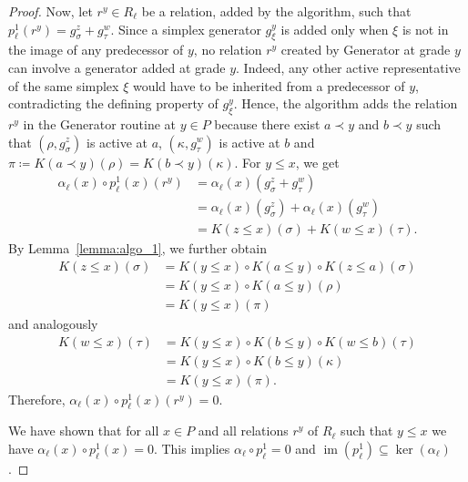 \documentclass[english,a4paper,nolineno,cleveref]{socg-lipics-v2021}
\DeclareMathOperator{\im}{im}
\begin{document}
\begin{proof}
Now, let $r^y\in R_\ell$ be a relation, added by the algorithm, such that $p_\ell^1(r^y)=g^z_\sigma+g^w_{\tau}$. Since a simplex generator $g_\xi^y$ is added only when
$\xi$ is not in the image of any predecessor of $y$, no relation
$r^y$ created by {\sc Generator} at grade $y$ can involve a generator
added at grade $y$. Indeed, any other active representative of the same
simplex $\xi$ would have to be inherited from a predecessor of $y$,
contradicting the defining property of $g_\xi^y$. Hence, the algorithm adds the relation $r^y$ in the {\sc Generator} routine at $y\in P$ because there exist $a\prec y$ and $b\prec y$ such that $(\rho,g^z_\sigma)$ is active at $a$, $(\kappa,g^w_{\tau})$ is active at $b$ and $\pi\coloneqq K(a\prec y)(\rho)=K(b\prec y)(\kappa)$. For $y\leq x$, we get 
\begin{equation*}
\begin{aligned}
\alpha_\ell(x)\circ p_\ell^1(x)(r^y)&=\alpha_\ell(x)(g^z_\sigma+g^w_{\tau})\\ &=\alpha_\ell(x)(g^z_\sigma)+\alpha_\ell(x)(g^w_{\tau})\\ &=K(z\leq x)(\sigma)+K(w\leq x)(\tau).    
\end{aligned}
\end{equation*}
By Lemma~\ref{lemma:algo_1}, we further obtain 
\begin{equation*}
\begin{aligned}
K(z\leq x)(\sigma)&=K(y\leq x)\circ K(a\leq y)\circ K(z\leq a)(\sigma)\\ &=K(y\leq x)\circ K(a\leq y)(\rho)\\ &=K(y\leq x)(\pi)   
\end{aligned} 
\end{equation*}
and analogously 
\begin{equation*}
\begin{aligned}
K(w\leq x)(\tau)&=K(y\leq x)\circ K(b\leq y)\circ K(w\leq b)(\tau)\\ &=K(y\leq x)\circ K(b\leq y)(\kappa)\\ &=K(y\leq x)(\pi).    
\end{aligned}
\end{equation*}
Therefore, $\alpha_\ell(x)\circ p_\ell^1(x)(r^y)=0$. 

We have shown that for all $x\in P$ and all relations $r^y$ of $R_\ell$ such that $y\leq x$ we have $\alpha_\ell(x)\circ p_\ell^1(x)=0$. This implies $\alpha_\ell\circ p_\ell^1=0$ and $\im(p_\ell^1)\subseteq \ker(\alpha_\ell)$.    
\end{proof}
\end{document}
